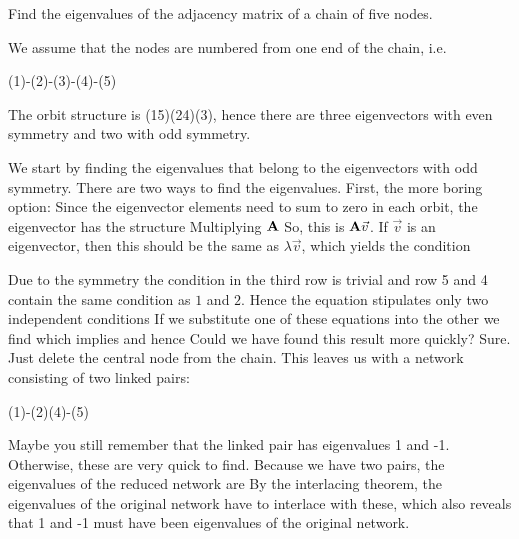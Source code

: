 Find the eigenvalues of the adjacency matrix of a chain of five nodes.

\solution
We assume that the nodes are numbered from one end of the chain, i.e.
\begin{center}
(1)-(2)-(3)-(4)-(5)
\end{center}
The orbit structure is (15)(24)(3), hence there are three eigenvectors with even symmetry and two with odd symmetry. 

We start by finding the eigenvalues that belong to the eigenvectors with odd symmetry. There are two ways to find the eigenvalues. First, the more boring option: Since the eigenvector elements need to sum to zero in each orbit, the eigenvector has the structure 
Multiplying ${\bf A}$
So, this is ${\bf A}\vec{v}$. If $\vec{v}$ is an eigenvector, then this should be the same as $\lambda \vec{v}$, which yields the condition

Due to the symmetry the condition in the third row is trivial and row 5 and 4 contain the same condition as $1$ and $2$. Hence the equation stipulates only two independent conditions 
If we substitute one of these equations into the other we find 
which implies 
and hence 
Could we have found this result more quickly? Sure. Just delete the central node from the chain. This leaves us with a network consisting of two linked pairs: 
\begin{center}
(1)-(2)\qqq (4)-(5)
\end{center}
Maybe you still remember that the linked pair has eigenvalues 1 and -1. Otherwise, these are very quick to find. Because we have two pairs, the eigenvalues of the reduced network are
By the interlacing theorem, the eigenvalues of the original network have to interlace with these, which also reveals that 1 and -1 must have been eigenvalues of the original network. 


